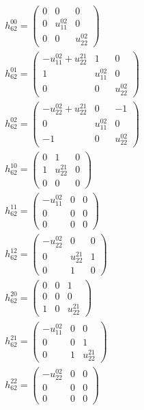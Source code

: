 \documentclass[a4paper, 11pt, twoside, onecolumn]{article}
\begin{document}
\begin{landscape}
\begin{gather*}
	 h_{62}^{00}=\begin{pmatrix}0 & 0 & 0\\0 & u^{02}_{11} & 0\\0 & 0 & u^{02}_{22}\end{pmatrix}\\ 
	 h_{62}^{01}=\begin{pmatrix}- u^{02}_{11} + u^{21}_{22} & 1 & 0\\1 & u^{02}_{11} & 0\\0 & 0 & u^{02}_{22}\end{pmatrix}\\ 
	 h_{62}^{02}=\begin{pmatrix}- u^{02}_{22} + u^{21}_{22} & 0 & -1\\0 & u^{02}_{11} & 0\\-1 & 0 & u^{02}_{22}\end{pmatrix}\\ 
	 h_{62}^{10}=\begin{pmatrix}0 & 1 & 0\\1 & u^{21}_{22} & 0\\0 & 0 & 0\end{pmatrix}\\ 
	 h_{62}^{11}=\begin{pmatrix}- u^{02}_{11} & 0 & 0\\0 & 0 & 0\\0 & 0 & 0\end{pmatrix}\\ 
	 h_{62}^{12}=\begin{pmatrix}- u^{02}_{22} & 0 & 0\\0 & u^{21}_{22} & 1\\0 & 1 & 0\end{pmatrix}\\ 
	 h_{62}^{20}=\begin{pmatrix}0 & 0 & 1\\0 & 0 & 0\\1 & 0 & u^{21}_{22}\end{pmatrix}\\ 
	 h_{62}^{21}=\begin{pmatrix}- u^{02}_{11} & 0 & 0\\0 & 0 & 1\\0 & 1 & u^{21}_{22}\end{pmatrix}\\ 
	 h_{62}^{22}=\begin{pmatrix}- u^{02}_{22} & 0 & 0\\0 & 0 & 0\\0 & 0 & 0\end{pmatrix}\\ 

\end{gather*}
\end{landscape}
\end{document}
